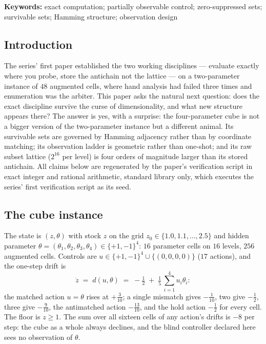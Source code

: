 \documentclass[10pt,twocolumn]{article}
\theoremstyle{plain}
\theoremstyle{definition}
\theoremstyle{remark}
\begin{document}
\textbf{Keywords:} exact computation; partially observable control;
zero-suppressed sets; survivable sets; Hamming structure; observation
design

\subsection{Introduction}\label{introduction}

The series' first paper established the two working disciplines --- evaluate exactly
where you probe, store the antichain not the lattice --- on a
two-parameter instance of \(48\) augmented cells, where hand analysis
had failed three times and enumeration was the arbiter. This paper asks the natural next question: does the exact discipline survive the
curse of dimensionality, and what new structure appears there? The
answer is yes, with a surprise: the four-parameter cube is not a
bigger version of the two-parameter instance but a different animal.
Its survivable sets are governed by Hamming adjacency rather than by
coordinate matching; its observation ladder is geometric rather than
one-shot; and its raw subset lattice (\(2^{16}\) per level) is four
orders of magnitude larger than its stored antichain. All claims below
are regenerated by the paper's verification script in exact integer
and rational arithmetic, standard library only, which executes the series' first verification script as its seed.

\subsection{The cube instance}\label{instance}

The state is \((z, \theta)\) with stock \(z\) on the grid
\(z_{0} \in \{1.0, 1.1, \dots, 2.5\}\) and hidden parameter
\(\theta = (\theta_{1}, \theta_{2}, \theta_{3}, \theta_{4}) \in
\{+1, -1\}^{4}\): \(16\) parameter cells on \(16\) levels, \(256\)
augmented cells. Controls are \(u \in \{+1,-1\}^{4} \cup \{(0,0,0,0)\}\)
(\(17\) actions), and the one-step drift is
\[
\dot z \;=\; d(u, \theta) \;=\; -\tfrac12
\;+\; \tfrac15\,\textstyle\sum_{i=1}^{4} u_{i}\theta_{i}:
\]
the matched action \(u = \theta\) rises at \(+\tfrac3{10}\); a single
mismatch gives \(-\tfrac1{10}\), two give \(-\tfrac12\), three give
\(-\tfrac9{10}\), the antimatched action \(-\tfrac{13}{10}\), and the
hold action \(-\tfrac12\) for every cell. The floor is \(z \ge 1\).
The sum over all sixteen cells of any action's drifts is \(-8\) per
step: the cube as a whole always declines, and the blind controller
declared here sees no observation of \(\theta\).
\end{document}
